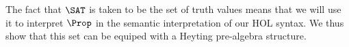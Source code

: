 





The fact that $\SAT$ is taken to be the set of truth values means that we will use it to interpret $\Prop$ in the semantic interpretation of our HOL syntax. We thus show that this set can be equiped with a Heyting pre-algebra structure.

